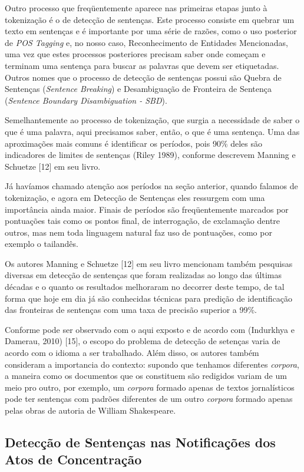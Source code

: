 \documentclass[11pt]{report}
\begin{document}
\indent\indent Outro processo que freqüentemente aparece nas primeiras etapas junto à tokenização é o de detecção de sentenças. Este processo consiste em
quebrar um texto em sentenças e é importante por uma série de razões, como o uso posterior de \textit{POS Tagging} e, no nosso caso, Reconhecimento de Entidades Mencionadas, uma
vez que estes processos posteriores precisam saber onde começam e terminam uma sentença para buscar as palavras que devem ser etiquetadas. Outros nomes que o processo de
detecção de sentenças possui são Quebra de Sentenças (\textit{Sentence Breaking}) e Desambiguação de Fronteira de Sentença (\textit{Sentence Boundary Disambiguation - SBD}).

Semelhantemente ao processo de tokenização, que surgia a necessidade de saber o que é uma palavra, aqui precisamos saber, então, o que é uma sentença. Uma das aproximações
mais comuns é identificar os períodos, pois 90\% deles são indicadores de limites de sentenças (Riley 1989), conforme descrevem Manning e Schuetze [12] em seu livro.

Já havíamos chamado atenção aos períodos na seção anterior, quando falamos de tokenização, e agora em Detecção de Sentenças eles ressurgem com uma importância ainda maior. Finais de
períodos são freqüentemente marcados por pontuações tais como os pontos final, de interrogação, de exclamação dentre outros, mas nem toda linguagem natural faz uso
de pontuações, como por exemplo o tailandês.

Os autores Manning e Schuetze [12] em seu livro mencionam também pesquisas diversas em detecção de sentenças que foram realizadas ao longo das últimas décadas e o quanto
os resultados melhoraram no decorrer deste tempo, de tal forma que hoje em dia já são conhecidas técnicas para predição de identificação das fronteiras de sentenças com uma
taxa de precisão superior a 99\%.

Conforme pode ser observado com o aqui exposto e de acordo com (Indurkhya e Damerau, 2010) [15], o escopo do problema de detecção de setenças varia de acordo com o idioma
a ser trabalhado. Além disso, os autores também consideram a importancia do contexto: supondo que tenhamos diferentes \textit{corpora}, a maneira como os documentos que os
constituem são redigidos variam de um meio pro outro, por exemplo, um \textit{corpora} formado apenas de textos jornalísticos pode ter sentenças com padrões diferentes de um outro
\textit{corpora} formado apenas pelas obras de autoria de William Shakespeare.

\subsection{Detecção de Sentenças nas Notificações dos Atos de Concentração}
\end{document}
